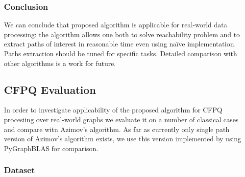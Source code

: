 \subsubsection{Conclusion}

We can conclude that proposed algorithm is applicable for real-world data processing: the algorithm allows one both to solve reachability problem and to extract paths of interest in reasonable time even using na{\"i}ve implementation.
Paths extraction should be tuned for specific tasks.
Detailed comparison with other algorithms is a work for future.

\subsection{CFPQ Evaluation}

In order to investigate applicability of the proposed algorithm for CFPQ procesiing over real-world graphs we evaluate it on a number of classical cases and compare witn Azimov's algorithm.
As far as currently only single path version of Azimov's algorithm exists, we use this version implemented by using PyGraphBLAS for comparison.

\subsubsection{Dataset}

